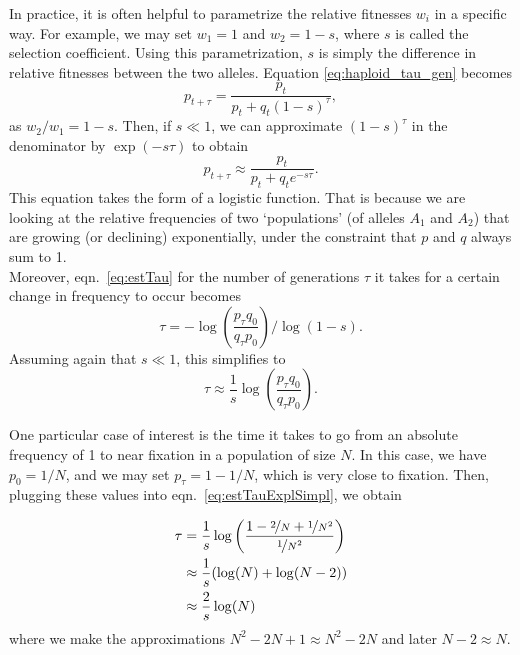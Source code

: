 In practice, it is often helpful to parametrize the relative fitnesses $w_i$ in a specific way. For example, we may set $w_1 = 1$ and $w_2 = 1 - s$, where $s$ is called the selection coefficient. Using this parametrization, $s$ is simply the difference in relative fitnesses between the two alleles. Equation \eqref{eq:haploid_tau_gen} becomes
\begin{equation}
	\label{eq:haploid_tau_gen_expl}
	p_{t+\tau} = \frac{p_{t}}{p_{t} + q_{t} (1 - s)^{\tau}},
\end{equation}
as $w_2 / w_1 = 1 - s$. Then, if $s \ll 1$, we can approximate $(1-s)^{\tau}$ in the denominator by $\exp(-s\tau)$ to obtain
\begin{equation} \label{eq:haploid_logistic growth}
	p_{t+\tau} \approx \frac{p_t}{p_t + q_t e^{-s\tau}}.
\end{equation}
This equation takes the form of a logistic function. That is because
we are looking at the relative frequencies of two `populations' (of
alleles $A_1$ and $A_2$) that are growing (or declining)
exponentially, under the constraint that $p$ and $q$ always sum to 1. \\

Moreover, eqn.\ \eqref{eq:estTau} for the number of generations $\tau$ it takes for a certain change in frequency to occur becomes
\begin{equation}
	\label{eq:estTauExpl}
	\tau = - \log \left(\frac{p_{\tau} q_0}{q_{\tau} p_0}\right) /  \log\left(1-s\right).
\end{equation}
Assuming again that $s \ll 1$, this simplifies to
\begin{equation}
	\label{eq:estTauExplSimpl}
	\tau \approx \frac{1}{s} \log \left(\frac{p_{\tau} q_0}{q_{\tau} p_0}\right).
\end{equation}


One particular case of interest is the time it takes to go from an absolute
frequency of 1 to near fixation in a population of size $N$.  In this case, we
have $p_0 = 1/N$, and we may set $p_{\tau} = 1 - 1/N$, which is very close to
fixation. Then, plugging these values into eqn.\ \eqref{eq:estTauExplSimpl}, we
obtain

\begin{align}
  \tau &= \frac{1}{s} \log\left( \frac{1 - \nicefrac{2}{N} +
      \nicefrac{1}{N^2}}{\nicefrac{1}{N^2}} \right) \nonumber \\
  &\approx \frac{1}{s} (\log(N) + \log(N-2)) \nonumber \\
  &\approx \frac{2}{s} \log(N)  \label{eq:fixTimeSimpl}
\end{align}
%
where we make the approximations $N^2 - 2N + 1 \approx N^2 - 2N$ and later
$N-2 \approx N$.



